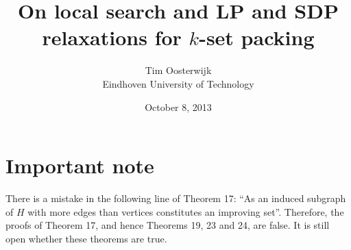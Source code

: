 \documentclass[11pt,twoside,openright]{book}
\let\origdoublepage\cleardoublepage
\newcommand{\clearemptydoublepage}{%
  \clearpage
  {\pagestyle{empty}\origdoublepage}%
}
\let\cleardoublepage\clearemptydoublepage
\begin{document}



\frontmatter

    \title{On local search and LP and SDP relaxations for $k$-set packing}
    \author{Tim Oosterwijk \\ Eindhoven University of Technology}
    \date{October 8, 2013}



\cleardoublepage

\section*{Important note}

There is a mistake in the following line of Theorem 17: ``As an induced subgraph of $H$ with more edges than vertices constitutes an improving set''. Therefore, the proofs of Theorem 17, and hence Theorems 19, 23 and 24, are false. It is still open whether these theorems are true.

\cleardoublepage


\cleardoublepage

\cleardoublepage





\newpage
{}
{}
\setcounter{tocdepth}{1}
\tableofcontents

\mainmatter















\appendix


\backmatter


\newpage
{}
{}
\thispagestyle{plain}

\end{document}
